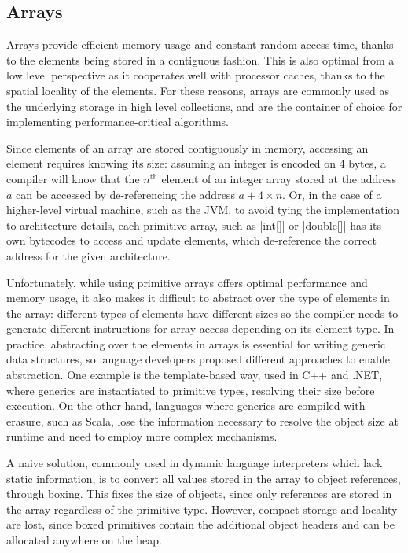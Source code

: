\subsection{Arrays}
\label{sec:mbarrays}

Arrays provide efficient memory usage and constant random access time, thanks to the elements being stored in a contiguous fashion. This is also optimal from a low level perspective as it cooperates well with processor caches, thanks to the spatial locality of the elements. For these reasons, arrays are commonly used as the underlying storage in high level collections, and are the container of choice for implementing performance-critical algorithms.

Since elements of an array are stored contiguously in memory, accessing an element requires knowing its size: assuming an integer is encoded on 4 bytes, a compiler will know that the $n^\text{th}$ element of an integer array stored at the address $a$ can be accessed by de-referencing the address $a + 4 \times n$. Or, in the case of a higher-level virtual machine, such as the JVM, to avoid tying the implementation to architecture details, each primitive array, such as |int[]| or |double[]| has its own bytecodes to access and update elements, which de-reference the correct address for the given architecture.

Unfortunately, while using primitive arrays offers optimal performance and memory usage, it also makes it difficult to abstract over the type of elements in the array: different types of elements have different sizes so the compiler needs to generate different instructions for array access depending on its element type. In practice, abstracting over the elements in arrays is essential for writing generic data structures, so language developers proposed different approaches to enable abstraction. One example is the template-based way, used in C++ and .NET, where generics are instantiated to primitive types, resolving their size before execution. On the other hand, languages where generics are compiled with erasure, such as Scala, lose the information necessary to resolve the object size at runtime and need to employ more complex mechanisms.

A naive solution, commonly used in dynamic language interpreters which lack static information, is to convert all values stored in the array to object references, through boxing. This fixes the size of objects, since only references are stored in the array regardless of the primitive type. However, compact storage and locality are lost, since boxed primitives contain the additional object headers and can be allocated anywhere on the heap.


